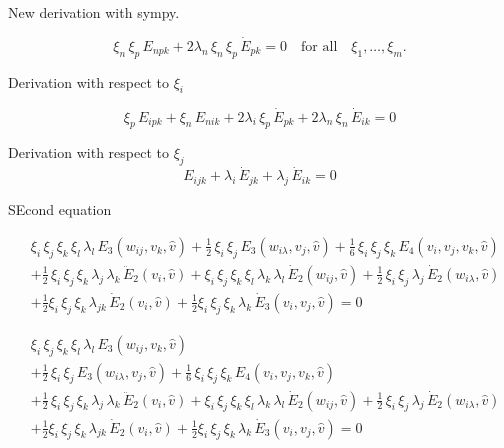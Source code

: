 New derivation with sympy.

\begin{equation}
  \xi_n \, \xi_p \, E_{npk} + 2\lambda_n \, \xi_n \, \xi_p \, \dot{E}_{pk} = 0 \quad \text{for all} \quad \xi_1, \dots, \xi_m.
\end{equation}

Derivation with respect to \(\xi_i\)

\begin{equation}
  \xi_p \, E_{ipk} + \xi_n \, E_{nik} + 2\lambda_i \, \xi_p \, \dot{E}_{pk} + 2\lambda_n \, \xi_n \, \dot{E}_{ik} = 0
\end{equation}

Derivation with respect to \(\xi_j\)
\begin{equation}
  E_{ijk} + \lambda_i \, \dot{E}_{jk} + \lambda_j \, \dot{E}_{ik} = 0
\end{equation}

SEcond equation

\begin{equation}
  \begin{aligned}
    & \xi_i \, \xi_j \, \xi_k \, \xi_l \, \lambda_l \, E_3(w_{ij}, v_k, \hat{v})
    + \tfrac{1}{2} \, \xi_i \, \xi_j \, E_3(w_{i\lambda}, v_j, \hat{v})
    + \tfrac{1}{6} \, \xi_i \, \xi_j \, \xi_k \, E_4(v_i, v_j, v_k, \hat{v})\\
    &+ \tfrac{1}{2} \, \xi_i \, \xi_j \, \xi_k \, \lambda_j \, \lambda_k \, \ddot{E}_2(v_i, \hat{v})
    + \xi_i \, \xi_j \, \xi_k \, \xi_l \, \lambda_k \, \lambda_l \, \dot{E}_2(w_{ij}, \hat{v})
    + \tfrac{1}{2} \, \xi_i \, \xi_j \, \lambda_j \, \dot{E}_2(w_{i\lambda}, \hat{v})\\
    &+ \tfrac{1}{2} \xi_i \, \xi_j \, \xi_k \, \lambda_{jk} \, \dot{E}_2(v_i, \hat{v})
    + \tfrac{1}{2} \xi_i \, \xi_j \, \xi_k \, \lambda_k \, \dot{E}_3(v_i, v_j, \hat{v}) = 0
  \end{aligned}
\end{equation}

\begin{equation}
  \begin{aligned}
    & \xi_i \, \xi_j \, \xi_k \, \xi_l \, \lambda_l \, E_3(w_{ij}, v_k, \hat{v})\\
    &+ \tfrac{1}{2} \, \xi_i \, \xi_j \, E_3(w_{i\lambda}, v_j, \hat{v})
    + \tfrac{1}{6} \, \xi_i \, \xi_j \, \xi_k \, E_4(v_i, v_j, v_k, \hat{v})\\
    &+ \tfrac{1}{2} \, \xi_i \, \xi_j \, \xi_k \, \lambda_j \, \lambda_k \, \ddot{E}_2(v_i, \hat{v})
    + \xi_i \, \xi_j \, \xi_k \, \xi_l \, \lambda_k \, \lambda_l \, \dot{E}_2(w_{ij}, \hat{v})
    + \tfrac{1}{2} \, \xi_i \, \xi_j \, \lambda_j \, \dot{E}_2(w_{i\lambda}, \hat{v})\\
    &+ \tfrac{1}{2} \xi_i \, \xi_j \, \xi_k \, \lambda_{jk} \, \dot{E}_2(v_i, \hat{v})
    + \tfrac{1}{2} \xi_i \, \xi_j \, \xi_k \, \lambda_k \, \dot{E}_3(v_i, v_j, \hat{v}) = 0
  \end{aligned}
\end{equation}
